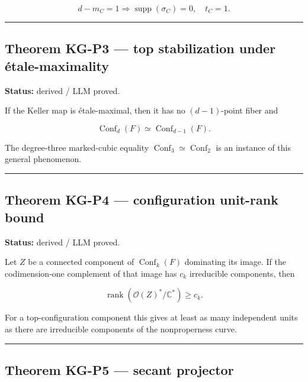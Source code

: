 \[
d-m_C=1
\Longrightarrow
\operatorname{supp}(\sigma_C)=0,\quad t_C=1.
\]

\begin{center}\rule{0.5\linewidth}{0.5pt}\end{center}

\subsection{Theorem KG-P3 --- top stabilization under
étale-maximality}\label{theorem-kg-p3-top-stabilization-under-uxe9tale-maximality}

\textbf{Status:} derived / LLM proved.

If the Keller map is étale-maximal, then it has no \((d-1)\)-point fiber
and

\[
\boxed{
\operatorname{Conf}_d(F)
\simeq
\operatorname{Conf}_{d-1}(F).
}
\]

The degree-three marked-cubic equality
\(\operatorname{Conf}_3\simeq\operatorname{Conf}_2\) is an instance of
this general phenomenon.

\begin{center}\rule{0.5\linewidth}{0.5pt}\end{center}

\subsection{Theorem KG-P4 --- configuration unit-rank
bound}\label{theorem-kg-p4-configuration-unit-rank-bound}

\textbf{Status:} derived / LLM proved.

Let \(Z\) be a connected component of \(\operatorname{Conf}_k(F)\)
dominating its image. If the codimension-one complement of that image
has \(c_k\) irreducible components, then

\[
\operatorname{rank}
\left(\mathcal O(Z)^*/\mathbb C^*\right)
\ge c_k.
\]

For a top-configuration component this gives at least as many
independent units as there are irreducible components of the
nonproperness curve.

\begin{center}\rule{0.5\linewidth}{0.5pt}\end{center}

\subsection{Theorem KG-P5 --- secant
projector}\label{theorem-kg-p5-secant-projector}

